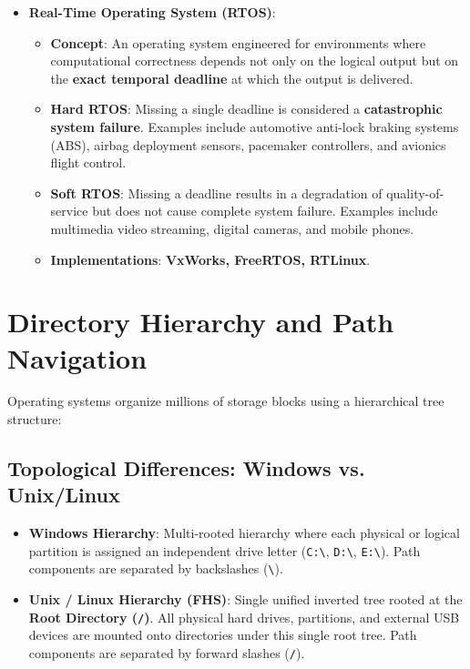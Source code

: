 \begin{itemize}[leftmargin=1.5em]
    \item \textbf{Real-Time Operating System (RTOS)}:
    \begin{itemize}
        \item \textbf{Concept}: An operating system engineered for environments where computational correctness depends not only on the logical output but on the \textbf{exact temporal deadline} at which the output is delivered.
        \item \textbf{Hard RTOS}: Missing a single deadline is considered a \textbf{catastrophic system failure}. Examples include automotive anti-lock braking systems (ABS), airbag deployment sensors, pacemaker controllers, and avionics flight control.
        \item \textbf{Soft RTOS}: Missing a deadline results in a degradation of quality-of-service but does not cause complete system failure. Examples include multimedia video streaming, digital cameras, and mobile phones.
        \item \textbf{Implementations}: \textbf{VxWorks, FreeRTOS, RTLinux}.
    \end{itemize}
\end{itemize}

\section{Directory Hierarchy and Path Navigation}

Operating systems organize millions of storage blocks using a hierarchical tree structure:

\subsection{Topological Differences: Windows vs. Unix/Linux}
\begin{itemize}
    \item \textbf{Windows Hierarchy}: Multi-rooted hierarchy where each physical or logical partition is assigned an independent drive letter (\texttt{C:\textbackslash{}}, \texttt{D:\textbackslash{}}, \texttt{E:\textbackslash{}}). Path components are separated by backslashes (\texttt{\textbackslash{}}).
    \item \textbf{Unix / Linux Hierarchy (FHS)}: Single unified inverted tree rooted at the \textbf{Root Directory (\texttt{/})}. All physical hard drives, partitions, and external USB devices are mounted onto directories under this single root tree. Path components are separated by forward slashes (\texttt{/}).
\end{itemize}

